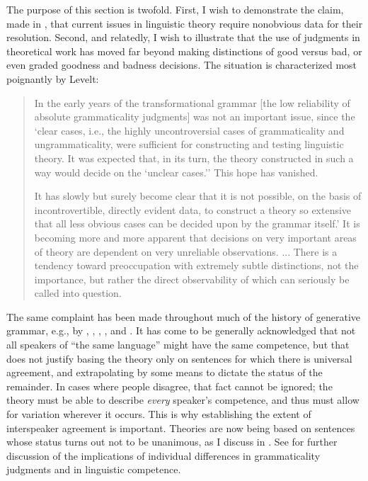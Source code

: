 \noindent The purpose of this section is twofold. First, I wish to demonstrate the claim, made in , that current issues in linguistic theory require nonobvious data for their resolution. Second, and relatedly, I wish to illustrate that the use of judgments in theoretical work has moved far beyond making distinctions of good versus bad, or even graded goodness and badness decisions. The situation is characterized most poignantly by Levelt:

\begin{quote}
In the early years of the transformational grammar [the low reliability of absolute grammaticality judgments] was not an important issue, since the `clear cases, i.e., the highly uncontroversial cases of grammaticality and ungrammaticality, were sufficient for constructing and testing linguistic theory. It was expected that, in its turn, the theory constructed in such a way would decide on the `unclear cases.'' This hope has vanished. \citep[88]{LeveltEtAl1977}

It has slowly but surely become clear that it is not possible, on the basis of incontrovertible, directly evident data, to construct a theory so extensive that all less obvious cases can be decided upon by the grammar itself.' It is becoming more and more apparent that decisions on very important areas of theory are dependent on very unreliable observations. ... There is a tendency toward preoccupation with extremely subtle distinctions, not the importance, but rather the direct observability of which can seriously be called into question. \citep[Vol. 2, p. 6]{Levelt1974}

\end{quote}

The same complaint has been made throughout much of the history of generative grammar, e.g., by \citet[348]{Bever1970a}, \citet[191]{Labov1972a}, \citet{Langendoen1972}, \citet{Coppieters1987}, and \citet[81]{Birdsong1989}. It has come to be generally acknowledged that not all speakers of ``the same language'' might have the same competence, but that does not justify basing the theory only on sentences for which there is universal agreement, and extrapolating by some means to dictate the status of the remainder. In cases where people disagree, that fact cannot be ignored; the theory must be able to describe \textit{every} speaker's competence, and thus must allow for variation wherever it occurs. This is why establishing the extent of interspeaker agreement is important. Theories are now being based on sentences whose status turns out not to be unanimous, as I discuss in . See 
for further discussion of the implications of individual differences in grammaticality judgments  and in linguistic competence.

